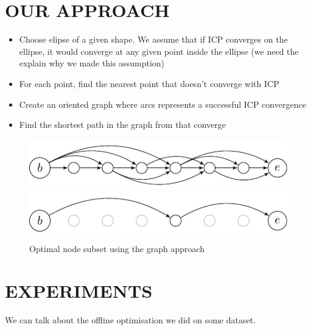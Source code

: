 \documentclass[letterpaper,10 pt,conference]{ieeeconf}
\begin{document}
\section{OUR APPROACH}
\label{approach}
\begin{itemize}
  \item Choose elipse of a given shape. We assume that if ICP converges on the
    ellipse, it would converge at any given point inside the ellipse (we need the explain why we made this assumption)

  \item For each point, find the nearest point that doesn't converge with ICP

  \item Create an oriented graph where arcs represents a successful ICP convergence

  \item Find the shortest path in the graph from that converge

\end{itemize}

\begin{figure}[thpb]
  \centering
  \includegraphics[scale=1.0]{unoptimized-graph}
  \includegraphics[scale=1.0]{optimized-graph}
  \caption{Optimal node subset using the graph approach}
\end{figure}


\section{EXPERIMENTS}
We can talk about the offline optimisation we did on some dataset.
\end{document}
